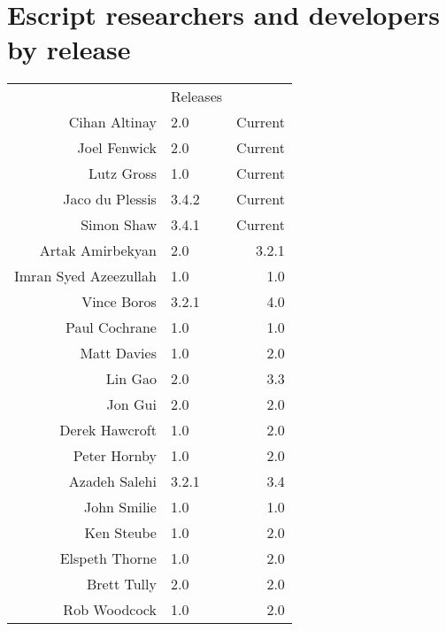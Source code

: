 
%
%
%

\chapter{Escript researchers and developers by release}

\begin{center}
\begin{tabular}{r|lr|}
& Releases\\ \cline{2-3}
Cihan Altinay & 2.0 & Current \\
Joel Fenwick & 2.0 & Current \\
Lutz Gross & 1.0 & Current \\
Jaco du Plessis & 3.4.2 & Current \\
Simon Shaw & 3.4.1 & Current \\
	\cline{1-3}  	
Artak Amirbekyan & 2.0 & 3.2.1 \\
Imran Syed Azeezullah & 1.0 & 1.0 \\
Vince Boros & 3.2.1 & 4.0 \\
Paul Cochrane & 1.0 & 1.0 \\
Matt Davies & 1.0 & 2.0 \\
Lin Gao & 2.0 & 3.3 \\
Jon Gui & 2.0 & 2.0 \\
Derek Hawcroft & 1.0 & 2.0 \\
Peter Hornby & 1.0 & 2.0 \\
Azadeh Salehi & 3.2.1 & 3.4 \\
John Smilie & 1.0 & 1.0 \\
Ken Steube & 1.0 & 2.0 \\
Elspeth Thorne & 1.0 & 2.0 \\
Brett Tully & 2.0 & 2.0 \\
Rob Woodcock & 1.0 & 2.0 \\
\cline{2-3}
\end{tabular}
\end{center}
